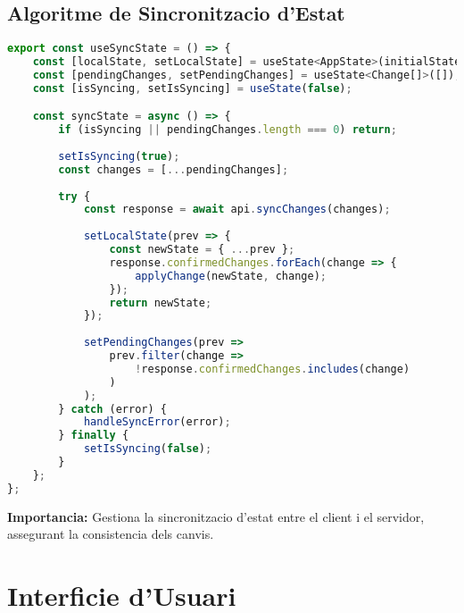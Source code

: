 \subsection{Algoritme de Sincronitzacio d'Estat}
\begin{lstlisting}[language=JavaScript]
export const useSyncState = () => {
    const [localState, setLocalState] = useState<AppState>(initialState);
    const [pendingChanges, setPendingChanges] = useState<Change[]>([]);
    const [isSyncing, setIsSyncing] = useState(false);

    const syncState = async () => {
        if (isSyncing || pendingChanges.length === 0) return;
        
        setIsSyncing(true);
        const changes = [...pendingChanges];
        
        try {
            const response = await api.syncChanges(changes);
            
            setLocalState(prev => {
                const newState = { ...prev };
                response.confirmedChanges.forEach(change => {
                    applyChange(newState, change);
                });
                return newState;
            });
            
            setPendingChanges(prev => 
                prev.filter(change => 
                    !response.confirmedChanges.includes(change)
                )
            );
        } catch (error) {
            handleSyncError(error);
        } finally {
            setIsSyncing(false);
        }
    };
};
\end{lstlisting}
\textbf{Importancia:} Gestiona la sincronitzacio d'estat entre el client i el servidor, assegurant la consistencia dels canvis.

\section{Interficie d'Usuari}

